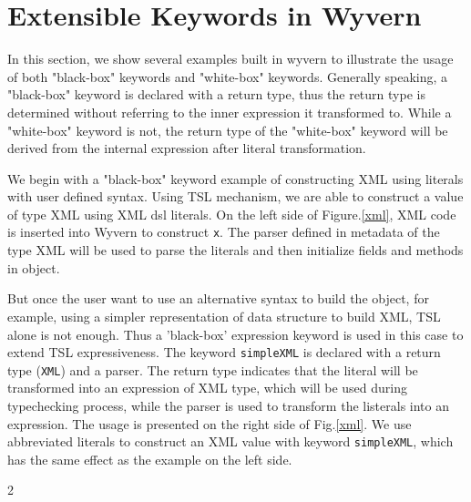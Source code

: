 \documentclass[letterpaper, notitlepage]{article}
\begin{document}
\section{Extensible Keywords in Wyvern}
In this section, we show several examples built in wyvern to illustrate the usage of both "black-box" keywords and "white-box" keywords. Generally speaking, a "black-box" keyword is declared with a return type, thus the return type is determined without referring to the inner expression it transformed to. While a "white-box" keyword is not, the return type of the "white-box" keyword will be derived from the internal expression after literal transformation.
\par
We begin with a "black-box" keyword example of constructing XML using literals with user defined syntax. Using TSL mechanism, we are able to construct a value of type XML using XML dsl literals. On the left side of Figure.\ref{xml}, XML code is inserted into Wyvern to construct \texttt{x}. The parser defined in metadata of the type XML will be used to parse the literals and then initialize fields and methods in object. 
\par
But once the user want to use an alternative syntax to build the object, for example, using a simpler representation of data structure to build XML, TSL alone is not enough. Thus a 'black-box' expression keyword is used in this case to extend TSL expressiveness. The keyword \texttt{simpleXML} is declared with a return type (\texttt{XML}) and a parser. The return type indicates that the literal will be transformed into an expression of XML type, which will be used during typechecking process, while the parser is used to transform the listerals into an expression. The usage is presented on the right side of Fig.\ref{xml}. We use abbreviated literals to construct an XML value with keyword \texttt{simpleXML}, which has the same effect as the example on the left side.

\begin{figure*}[htb!]
\begin{parcolumns}{2}
\end{parcolumns}
\caption{Building a value of type XML using a TSL providing the standard syntax (left) or using a ``black-box'' expression keyword providing a simpler layout-sensitive syntax (right).}
\label{xml}
\end{figure*}
\end{document}
